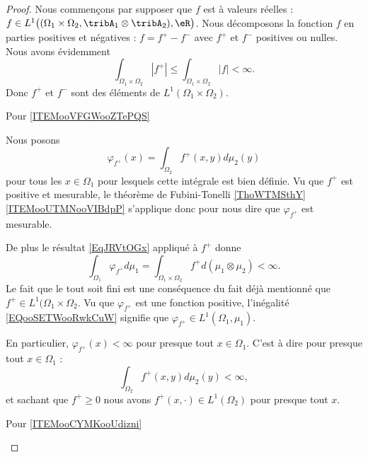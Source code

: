 \begin{proof}
    Nous commençons par supposer que \( f\) est à valeurs réelles : \( f\in L^1\big( (\Omega_1\times \Omega_2,\tribA_1\otimes\tribA_2 ),\eR\big)\). Nous décomposons la fonction \( f\) en parties positives et négatives : \( f=f^+-f^-\) avec \( f^+\) et \( f^-\) positives ou nulles. Nous avons évidemment
    \begin{equation}
        \int_{\Omega_1\times \Omega_2}| f^+ |\leq \int_{\Omega_1\times \Omega_2}| f |<\infty.
    \end{equation}
    Donc \( f^+\) et \( f^-\) sont des éléments de \( L^1(\Omega_1\times \Omega_2)\). 
    
    \begin{subproof}
    \item[Pour \ref{ITEMooVFGWooZTePQS}]

    Nous posons
    \begin{equation}
        \varphi_{f^+}(x)=\int_{\Omega_2}f^{+}(x,y)d\mu_2(y)
    \end{equation}
    pour tous les \( x\in \Omega_1\) pour lesquels cette intégrale est bien définie. Vu que \( f^+\) est positive et mesurable, le théorème de Fubini-Tonelli \ref{ThoWTMSthY}\ref{ITEMooUTMNooVIBdpP} s'applique donc pour nous dire que \( \varphi_{f^+}\) est mesurable.

    De plus le résultat \eqref{EqJRVtOGx} appliqué à \( f^+\) donne
    \begin{equation}        \label{EQooSETWooRwkCuW}
        \int_{\Omega_1}\varphi_{f^+}d\mu_1=\int_{\Omega_1\times \Omega_2}f^+d(\mu_1\otimes \mu_2)<\infty.
    \end{equation}
    Le fait que le tout soit fini est une conséquence du fait déjà mentionné que \( f^+\in L^1(\Omega_1\times \Omega_2\). Vu que \( \varphi_{f^+}\) est une fonction positive, l'inégalité \eqref{EQooSETWooRwkCuW} signifie que \( \varphi_{f^+}\in L^1(\Omega_1,\mu_1)\).

    En particulier, \( \varphi_{f^+}(x)<\infty\) pour presque tout \( x\in\Omega_1\). C'est à dire pour presque tout \( x\in \Omega_1\) :
    \begin{equation}
        \int_{\Omega_2}f^+(x,y)d\mu_2(y)<\infty,
    \end{equation}
    et sachant que \( f^+\geq 0\) nous avons \( f^+(x,\cdot)\in L^1(\Omega_2)\) pour presque tout \( x\).
    
        \item[Pour \ref{ITEMooCYMKooUdizni}]


\end{subproof}
\end{proof}
